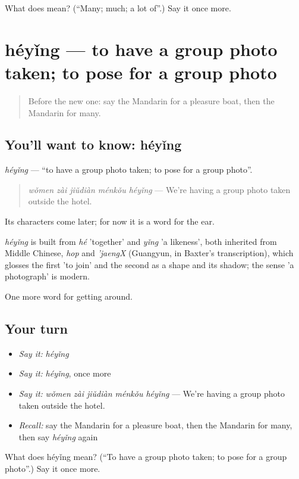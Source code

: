 \begin{tcolorbox}[breakable,colback=teal!4,colframe=teal!35!black,title={Before you move on}]
What does  mean? (\textquotedblleft{}Many; much; a lot of\textquotedblright{}.) Say it once more.
\end{tcolorbox}
\section[héyǐng]{héyǐng — to have a group photo taken; to pose for a group photo}

\label{lesson:ZH-C431-heying}



\begin{quote}
Before the new one: say the Mandarin for a pleasure boat, then the Mandarin for many.
\end{quote}

\subsection*{You'll want to know: héyǐng}
\emph{héyǐng} — \textquotedblleft{}to have a group photo taken; to pose for a group photo\textquotedblright{}.

\begin{quote}
\emph{wǒmen zài jiǔdiàn ménkǒu héyǐng} — We're having a group photo taken outside the hotel.
\end{quote}

Its characters come later; for now it is a word for the ear.

\begin{cousinweb}
\emph{héyǐng} is built from \emph{hé} 'together' and \emph{yǐng} 'a likeness', both inherited from Middle Chinese, \emph{hop} and \emph{'jaengX} (Guangyun, in Baxter's transcription), which glosses the first 'to join' and the second as a shape and its shadow; the sense 'a photograph' is modern.
\end{cousinweb}

\begin{grammarlens}[title={What you've built}]
One more word for getting around.
\end{grammarlens}

\subsection*{Your turn}
\begin{itemize}
\raggedright
  \item \emph{Say it:} \emph{héyǐng}
  \item \emph{Say it:} \emph{héyǐng}, once more
  \item \emph{Say it:} \emph{wǒmen zài jiǔdiàn ménkǒu héyǐng} — We're having a group photo taken outside the hotel.
  \item \emph{Recall:} say the Mandarin for a pleasure boat, then the Mandarin for many, then say \emph{héyǐng} again
\end{itemize}

\begin{tcolorbox}[breakable,colback=teal!4,colframe=teal!35!black,title={Before you move on}]
What does héyǐng mean? (\textquotedblleft{}To have a group photo taken; to pose for a group photo\textquotedblright{}.) Say it once more.
\end{tcolorbox}
